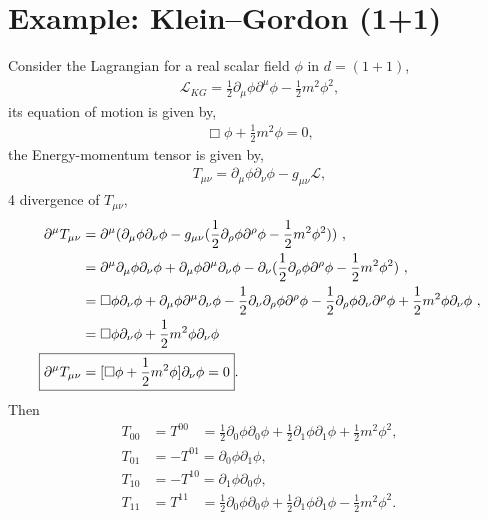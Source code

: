 \documentclass[12pt,a4paper]{report}
\begin{document}
\section{Example: Klein–Gordon (1+1)}
Consider the Lagrangian \cite{david, Peskin, Tripathy, Itzykson} for a real scalar field $\phi$ in $d=(1+1)$,
\begin{align}
	\mathcal{L}_{KG}=\frac{1}{2}\partial_{\mu}\phi\partial^{\mu}\phi-\frac{1}{2}m^2\phi^2,
	\end{align}
its equation of motion is given by,
\begin{align}
	\Box\phi+\frac{1}{2}m^2\phi=0,
	\end{align}
the Energy-momentum tensor is given by,
\begin{align}
	T_{\mu\nu}=\partial_\mu\phi\partial_\nu\phi-g_{\mu\nu}\mathcal{L},
	\end{align}
		4 divergence of $T_{\mu\nu}$,
	\begin{align}
	\partial^{\mu}T_{\mu\nu}&=\partial^{\mu}(\partial_\mu\phi\partial_\nu\phi-g_{\mu\nu}(\frac{1}{2}\partial_{\rho}\phi\partial^{\rho}\phi-\frac{1}{2}m^2\phi^2))~, \nonumber\\
	&=\partial^{\mu}\partial_\mu\phi\partial_\nu\phi+\partial_\mu\phi\partial^{\mu}\partial_\nu\phi-\partial_{\nu}(\frac{1}{2}\partial_{\rho}\phi\partial^{\rho}\phi-\frac{1}{2}m^2\phi^2)~, \nonumber\\
	&=\Box\phi\partial_\nu\phi+\partial_\mu\phi\partial^{\mu}\partial_\nu\phi-\frac{1}{2}\partial_{\nu}\partial_{\rho}\phi\partial^{\rho}\phi-\frac{1}{2}\partial_{\rho}\phi\partial_{\nu}\partial^{\rho}\phi+\frac{1}{2}m^2\phi \partial_{\nu}\phi~,\nonumber\\
	&=\Box\phi\partial_\nu\phi+\frac{1}{2}m^2\phi \partial_{\nu}\phi\nonumber\\
	\Aboxed{\partial^{\mu}T_{\mu\nu}&=[\Box\phi+\frac{1}{2}m^2\phi] \partial_{\nu}\phi=0}.
	\end{align}
	Then
	\begin{align}
	T_{00}&=T^{00}\;\;\;=\frac{1}{2}\partial_0\phi\partial_0\phi+\frac{1}{2}\partial_1\phi\partial_1\phi+\frac{1}{2}m^2\phi^2, \nonumber \\
	T_{01}&=-T^{01}=\partial_0\phi\partial_1\phi ,\nonumber \\
	T_{10}&=-T^{10}=\partial_1\phi\partial_0\phi, \nonumber \\
	T_{11}&=T^{11}\;\;\;=\frac{1}{2}\partial_0\phi\partial_0\phi+\frac{1}{2}\partial_1\phi\partial_1\phi-\frac{1}{2}m^2\phi^2.\nonumber
	\end{align}
\end{document}
